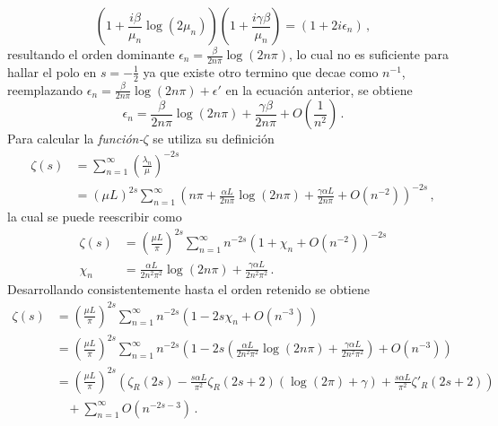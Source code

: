 \begin{equation}
\left( 1 + \frac{i \beta}{ \mu _n} \log ( 2 \mu _n) \right) 
\left(1 + \frac{i  \gamma \beta}{ \mu _n} \right)  =
(1 + 2 i \epsilon _n) \, ,
\end{equation}
resultando el orden dominante $\epsilon _n =  \frac{\beta }{2 n \pi}  \log (2 n \pi)$, lo cual no es suficiente para hallar el polo en $s=- \frac{1}{2}$ ya que existe otro termino que decae como $ n ^{-1}$, reemplazando $\epsilon _n =  \frac{\beta }{2 n \pi} \log (2 n \pi) + \epsilon '$ en la ecuación anterior, se obtiene
\begin{equation}\label{anterior}
    \epsilon _n =  \frac{\beta }{2 n \pi} \log (2 n \pi) +
                \frac{\gamma \beta}{2 n \pi} +
                O\left(  \frac{1}{n^2} \right)
                	\, .
\end{equation}
Para calcular la {\it función-$\zeta $} se utiliza su definición
\begin{equation}
\begin{aligned}
    \zeta (s) &= \sum _{n=1} ^{\infty} \left( \frac{\lambda _n}{\mu} \right) ^{-2 s}  \\
    & =    ( \mu L) ^{2 s} \sum _{n=1} ^{\infty} 
    \left( 
    n \pi + \frac{\alpha L }{2 n \pi} \log (2 n \pi) + \frac{\gamma \alpha L}{2 n \pi} +
    O \left( n^{-2} \right)
    \right) ^{-2s}
    	\, ,
\end{aligned}
\end{equation}
la cual se puede reescribir como
\begin{equation}
\begin{aligned}
    \zeta  (s) &= \left( \frac{\mu L }{\pi} \right)  ^{2 s} 
    \sum _{n=1} ^{\infty} n ^{- 2  s} 
    \left(
    	1 + \chi _n  + O( n^{-2} )
    	\right) ^{-2 s} \\[5pt]
		 \chi _n &= 
    	\frac{\alpha L  }{2 n^2 \pi ^2} \log (2 n \pi) + 
    	\frac{\gamma \alpha L}{2 n^2 \pi ^2 }  
    			\, .
\end{aligned}
\end{equation}
Desarrollando consistentemente hasta el orden retenido se obtiene
\begin{align}\label{eq.zeta.c}
    \zeta  (s) &= \left( \frac{\mu L}{\pi} \right) ^{2 s}
    \sum _{n=1} ^{\infty} 
    n ^{-2s}
    \left(
    1 - 2 s \chi _n + O \left( n ^{-3} \right) \
    \right)   \nonumber \\[5pt]
     &= \left( \frac{\mu L }{\pi} \right) ^{2 s}
    \sum _{n=1} ^{\infty} n ^{-2 s} 
    \left(
    1 - 2s \left(
    \frac{\alpha L }{2 n ^2 \pi ^2} \log ( 2  n \pi) + 
    \frac{\gamma \alpha L }{2 n ^2 \pi ^2} 
	\right) +
    O \left( n ^{-3}   \right)
    \right) \nonumber \\[5pt]
    &=   \left( \frac{\mu L }{ \pi } \right) ^{2 s}  
    \left( \zeta _R (2 s) -
	\frac{ s \alpha L}{ \pi ^2} \zeta _R (2s+2)
	\left(
	    \log (2  \pi ) + \gamma
	\right) + 
    \frac{s \alpha L}{\pi ^2}
	\zeta ' _R(2s+2) \right) \nonumber \\[5pt]
	&\ \ \ \  + \sum _{n=1} ^{\infty} O \left( n ^{-2s-3} \right) \, .
\end{align}    
